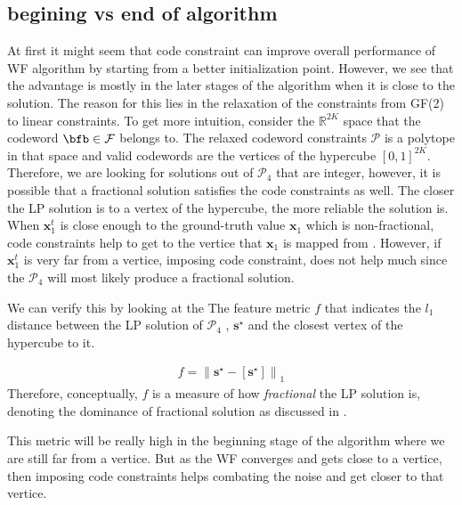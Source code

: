 \subsection{begining vs end of algorithm}

At first it might seem that code constraint can improve overall performance of WF algorithm by starting from a better initialization point. However, we 
see that the advantage is mostly in the later stages of the algorithm when it is close to the solution. The reason for this lies in the relaxation of the constraints from GF(2)
to linear constraints.
To get more intuition, consider the $\mathbb{R}^{2K}$ space that the codeword $\bfb \in \cal{F}$ belongs to. The relaxed codeword constraints $\mathcal{P}$ is 
a polytope in that space and valid codewords are the vertices of the hypercube $[0,1]^{2K}$. Therefore, we are looking for 
solutions out of $\mathcal{P}_4$ that are integer, however, it is possible that a fractional solution satisfies the code constraints as well. The closer the LP solution is to a vertex of
the hypercube, the more reliable the solution is. 
When $\mathbf{x}_1^t$ is close enough to the ground-truth value $\mathbf{x}_1$ which is non-fractional, code constraints help to get to the vertice that $\mathbf{x}_1$ is mapped from .
However, if $\mathbf{x}_1^t$ is very far from a vertice, imposing code constraint, does not help much since the $\mathcal{P}_4$ will most likely produce a fractional solution.

We can verify this by looking at the The feature metric $f$ that
indicates the $l_1$ distance between the LP solution of $\mathcal{P}_4$ , $\mathbf{s}^\star$ and the closest vertex of the hypercube to it.

\begin{equation}
\begin{aligned}
f = {\parallel \mathbf{s}^\star - [\mathbf{s}^\star] \parallel }_1
\end{aligned}
\end{equation}
Therefore, conceptually, $f$ is a measure 
of how \emph{fractional} the LP solution is, denoting 
the dominance of fractional solution 
as discussed in \cite{feldman2005using}. 

This metric will be really high in the beginning stage of the algorithm where we are still 
far from a vertice. But as the WF converges and gets close to a vertice, then imposing code constraints helps combating the noise and get closer to that vertice.





